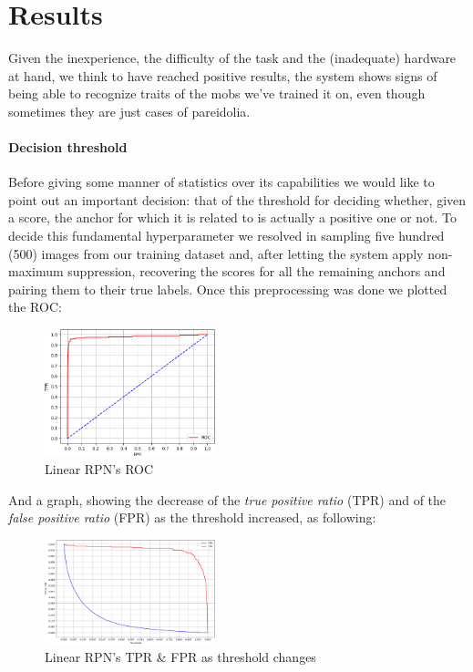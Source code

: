 \documentclass[10pt,journal,cspaper,compsoc]{IEEEtran}
\begin{document}
    \section{Results}
    Given the inexperience, the difficulty of the task and the (inadequate) hardware at hand, we think to have reached positive results, the system shows signs of being able to recognize traits of the mobs we've trained it on, even though sometimes they are just cases of pareidolia.
    \paragraph{Decision threshold} Before giving some manner of statistics over its capabilities we would like to point out an important decision: that of the threshold for deciding whether, given a score, the anchor for which it is related to is actually a positive one or not. To decide this fundamental hyperparameter we resolved in sampling five hundred (500) images from our training dataset and, after letting the system apply non-maximum suppression, recovering the scores for all the remaining anchors and pairing them to their true labels. Once this preprocessing was done we plotted the ROC:

    \begin{figure}[h]
        \centering
        \includegraphics[width=0.44\textwidth]{images/ROC.png}
        \caption{Linear RPN's ROC}
    \end{figure}

    And a graph, showing the decrease of the \emph{true positive ratio} (TPR) and of the \emph{false positive ratio} (FPR) as the threshold increased, as following:

    \begin{figure}[h]
        \centering
        \includegraphics[width=0.44\textwidth]{images/threshold_decision.png}
        \caption{Linear RPN's TPR \& FPR as threshold changes}
    \end{figure}
\end{document}
